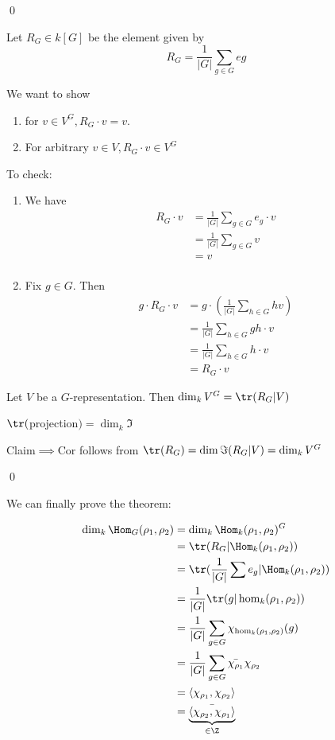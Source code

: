 \documentclass[x11names,reqno,14pt]{extarticle}
\begin{document}
\qed

\proof

Let $R_G \in k[G]$ be the element given by 
\[
R_G = \frac{1}{|G|}\sum_{g\in G}eg
\]

We want to show 
\begin{enumerate}

\item for $v \in V^G, R_G\cdot v = v$. 

\item For arbitrary $v \in V, R_G\cdot v \in V^G$

\end{enumerate}

To check:

\begin{enumerate}

\item We have 
\begin{align*}
R_G\cdot v & = \frac{1}{|G|}\sum_{g\in G}e_g\cdot v \\
& = \frac{1}{|G|}\sum_{g\in G}v \\
& = v\\
\end{align*}

\item Fix $g \in G$. Then 
\begin{align*}
g\cdot R_G\cdot v & = g\cdot (\frac{1}{|G|}\sum_{h\in G}hv) \\
& = \frac{1}{|G|} \sum_{h\in G}gh\cdot v \\
& = \frac{1}{|G|}\sum_{h\in G}h\cdot v \\
& = R_G\cdot v
\end{align*}
\end{enumerate}

\cor

Let $V$ be a $G$-representation. Then $\dim_kV^G = \tr(R_G|V)$

\proof

\claim

$\tr($projection$) = \dim_k\Im$

\proof

Claim$\implies$Cor follows from $\tr(R_G) = \dim\Im(R_G|V) = \dim_kV^G$

\qed

We can finally prove the theorem: 

\proof

\begin{align*}
\dim_k\Hom_G(\rho_1,\rho_2) & = \dim_k\Hom_k(\rho_1,\rho_2)^G \\
& = \tr(R_G|\Hom_k(\rho_1,\rho_2)) \\
& = \tr(\frac{1}{|G|}\sum e_g|\Hom_k(\rho_1,\rho_2)) \\
& = \frac{1}{|G|}\tr(g|\hom_k(\rho_1,\rho_2)) \\
& = \frac{1}{|G|}\sum_{g\in G}\chi_{\hom_k(\rho_1,\rho_2)}(g) \\
& = \frac{1}{|G|}\sum_{g\in G}\bar{\chi_{\rho_1}}\chi_{\rho_2} \\
& = \langle\chi_{\rho_1},\chi_{\rho_2} \rangle \\
& = \bar{\underbrace{\langle\chi_{\rho_2},\chi_{\rho_1}\rangle}_{\in \Z}} \\
\end{align*}
\end{document}
